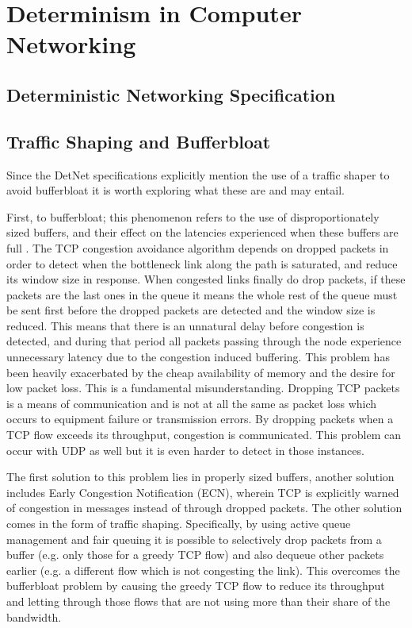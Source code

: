 \section{Determinism in Computer Networking}


\subsection{Deterministic Networking Specification}



\subsection{Traffic Shaping and Bufferbloat}

Since the DetNet specifications explicitly mention the use of a traffic shaper to avoid bufferbloat it is worth exploring what these are and may entail.

First, to bufferbloat; this phenomenon refers to the use of disproportionately sized buffers, and their effect on the latencies experienced when these buffers are full \cite{allman2012comments, gettys2011bufferbloat}. The TCP congestion avoidance algorithm depends on dropped packets in order to detect when the bottleneck link along the path is saturated, and reduce its window size in response. When congested links finally do drop packets, if these packets are the last ones in the queue it means the whole rest of the queue must be sent first before the dropped packets are detected and the window size is reduced. This means that there is an unnatural delay before congestion is detected, and during that period all packets passing through the node experience unnecessary latency due to the congestion induced buffering. This problem has been heavily exacerbated by the cheap availability of memory and the desire for low packet loss. This is a fundamental misunderstanding. Dropping TCP packets is a means of communication and is not at all the same as packet loss which occurs to equipment failure or transmission errors. By dropping packets when a TCP flow exceeds its throughput, congestion is communicated. This problem can occur with UDP as well but it is even harder to detect in those instances.

The first solution to this problem lies in properly sized buffers, another solution includes Early Congestion Notification (ECN), wherein TCP is explicitly warned of congestion in messages instead of through dropped packets. The other solution comes in the form of traffic shaping. Specifically, by using active queue management and fair queuing it is possible to selectively drop packets from a buffer (e.g. only those for a greedy TCP flow) and also dequeue other packets earlier (e.g. a different flow which is not congesting the link). This overcomes the bufferbloat problem by causing the greedy TCP flow to reduce its throughput and letting through those flows that are not using more than their share of the bandwidth.

